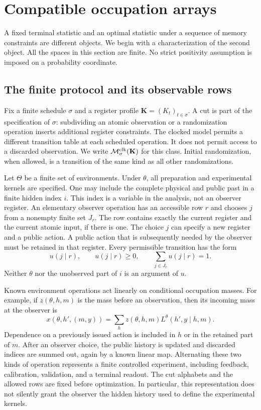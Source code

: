 \section{Compatible occupation arrays}
\label{sec:v23-occupations}
A fixed terminal statistic and an optimal statistic under a sequence of
memory constraints are different objects. We begin with a characterization
of the second object. All the spaces in this section are finite. No
strict positivity assumption is imposed on a probability coordinate.

\subsection{The finite protocol and its observable rows}
Fix a finite schedule $\sigma$ and a register profile
$\mathbf K=(K_t)_{t\in\sigma}$. A cut is part of the specification of
$\sigma$: subdividing an atomic observation or a randomization operation
inserts additional register constraints. The clocked model permits a
different transition table at each scheduled operation. It does not
permit access to a discarded observation. We write
$\mathcal M^{\rm clk}_\sigma(\mathbf K)$ for this class. Initial
randomization, when allowed, is a transition of the same kind as all
other randomizations.

Let $\Theta$ be a finite set of environments. Under $\theta$, all
preparation and experimental kernels are specified. One may include
the complete physical and public past in a finite hidden index $i$.
This index is a variable in the analysis, not an observer register.
An elementary observer operation has an accessible row $r$ and chooses
$j$ from a nonempty finite set $J_r$. The row contains exactly the
current register and the current atomic input, if there is one. The
choice $j$ can specify a new register and a public action. A public
action that is subsequently needed by the observer must be retained in
that register. Every permissible transition has the form
\begin{equation}\label{eq:v23-row}
 u(j\mid r),\qquad u(j\mid r)\ge0,\qquad
 \sum_{j\in J_r}u(j\mid r)=1.
\end{equation}
Neither $\theta$ nor the unobserved part of $i$ is an argument of $u$.

Known environment operations act linearly on conditional occupation
masses. For example, if $z(\theta,h,m)$ is the mass before an observation,
then its incoming mass at the observer is
\begin{equation}\label{eq:v23-prediction}
 x(\theta,h',(m,y))=
       \sum_h z(\theta,h,m)L^\theta(h',y\mid h,m).
\end{equation}
Dependence on a previously issued action is included in $h$ or in the
retained part of $m$. After an observer choice, the public history is
updated and discarded indices are summed out, again by a known linear
map. Alternating these two kinds of operation represents a finite
controlled experiment, including feedback, calibration, validation,
and a terminal readout. The cut alphabets and the allowed rows are
fixed before optimization. In particular, this representation does not
silently grant the observer the hidden history used to define the
experimental kernels.

